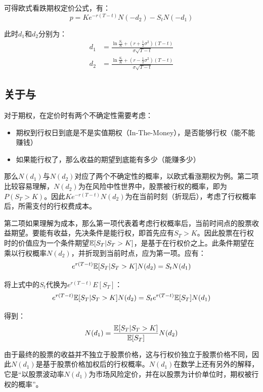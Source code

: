 \documentclass[11pt]{article}
\begin{document}
可得欧式看跌期权定价公式，有：
\begin{equation*}
    \boxed{
    p = K e^{-r(T-t)}N(-d_2) - S_t N(-d_1)
    }
\end{equation*}

此时$d_1$和$d_2$分别为：
\begin{align*}
    d_1 &= \frac{\ln \frac{S_t}{K} + (r+\frac{1}{2}\sigma^2)(T-t)}{\sigma\sqrt{T-t}} \\
    d_2 &= \frac{\ln \frac{S_t}{K} + (r-\frac{1}{2}\sigma^2)(T-t)}{\sigma\sqrt{T-t}}
\end{align*}

\subsection{关于与}

对于期权，在定价时有两个不确定性需要考虑：
\begin{itemize}
    \item 期权到行权日到底是不是实值期权（In-The-Money），是否能够行权（能不能赚钱）
    \item 如果能行权了，那么收益的期望到底能有多少（能赚多少）
\end{itemize}

那么$N(d_1)$与$N(d_2)$对应了两个不确定性的概率，以欧式看涨期权为例。第二项比较容易理解，$N(d_2)$为在风险中性世界中，股票被行权的概率，即为$P(S_T>K)$。因此$Ke^{-r(T-t)}N(d_2)$为在当前时刻（折现后），考虑了行权概率后，所需支付的行权费成本。

第二项如果理解为成本，那么第一项代表着考虑行权概率后，当前时间点的股票收益期望。要能有收益，先决条件是能行权，即首先应有$S_T>K$。因此股票在行权时的价值应为一个条件期望$\mathbb{E}[S_T | S_T >K]$，是基于在行权价之上。此条件期望在乘以行权概率$N(d_2)$，并折现到当前时点，应为第一项。应有：
\begin{equation*}
    e^{r(T-t)} \mathbb{E}[S_T | S_T >K] N(d_2) = S_t N(d_1)
\end{equation*}

将上式中的$S_t$代换为$e^{r(T-t)}E[S_T]$：
\begin{equation*}
    e^{r(T-t)} \mathbb{E}[S_T | S_T >K] N(d_2) = S_t e^{r(T-t)}\mathbb{E}[S_T] N(d_1)
\end{equation*}

得到：
\begin{equation*}
    N(d_1) = \frac{\mathbb{E}[S_T | S_T >K]}{\mathbb{E}[S_T]} N(d_2)
\end{equation*}

由于最终的股票的收益并不独立于股票价格，这与行权价独立于股票价格不同，因此$N(d_1)$是基于股票价格加权后的行权概率。$N(d_1)$在数学上还有另外的解释，它是“以股票波动率$N(d_1)$为市场风险定价，并在以股票为计价单位时，期权被行权的概率”。
\end{document}
